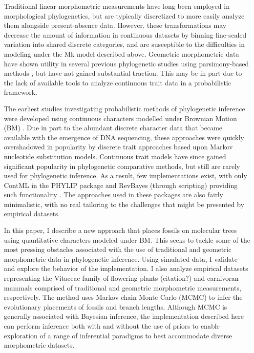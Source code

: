 \documentclass[12pt]{article}
\begin{document}
Traditional linear morphometric measurements have long been employed in
morphological phylogenetics, but are typically discretized to more
easily analyze them alongside present-absence data. However, these
transformations may decrease the amount of information in continuous
datasets by binning fine-scaled variation into shared discrete
categories, and are susceptible to the difficulties in modeling under
the Mk model described above. Geometric morphometric data have shown
utility in several previous phylogenetic studies using parsimony-based
methods \citep{geomorphhominin,catalano2010phylogenetic,smith2013geometric}, but have not gained substantial traction.
This may be in part due to the lack of available tools to analyze
continuous trait data in a probabilistic framework.

The earliest studies investigating probabilistic methods of phylogenetic
inference were developed using continuous characters modelled under
Brownian Motion (BM) \citep{cavalli1967,felsenstein1973}. Due in part to the abundant discrete character data that became
available with the emergence of DNA sequencing, these approaches were
quickly overshadowed in popularity by discrete trait approaches based
upon Markov nucleotide substitution models. Continuous trait models have
since gained significant popularity in phylogenetic comparative methods,
but still are rarely used for phylogenetic inference. As a result, few
implementations exist, with only ContML in the PHYLIP package and
RevBayes (through scripting) providing such functionality \citep{hohna2016revbayes}. The
approaches used in these packages are also fairly minimalistic, with no
real tailoring to the challenges that might be presented by empirical
datasets.

In this paper, I describe a new approach that places fossils on
molecular trees using quantitative characters modeled under BM. This
 seeks to tackle some of the most pressing obstacles associated
with the use of traditional and geometric morphometric data in
phylogenetic inference. Using simulated data, I validate and explore the
behavior of the implementation. I also analyze empirical datasets
representing the Vitaceae family of flowering plants (citation?) and carnivoran
mammals \citep{jones2015impact} comprised of traditional and geometric
morphometric measurements, respectively. The method uses Markov chain
Monte Carlo (MCMC) to infer the evolutionary placements of fossils and
branch lengths. Although MCMC is generally associated with Bayesian
inference, the implementation described here can perform inference both with and without
the use of priors to enable exploration of a range of inferential paradigms to best accommodate diverse
morphometric datasets.
\end{document}
